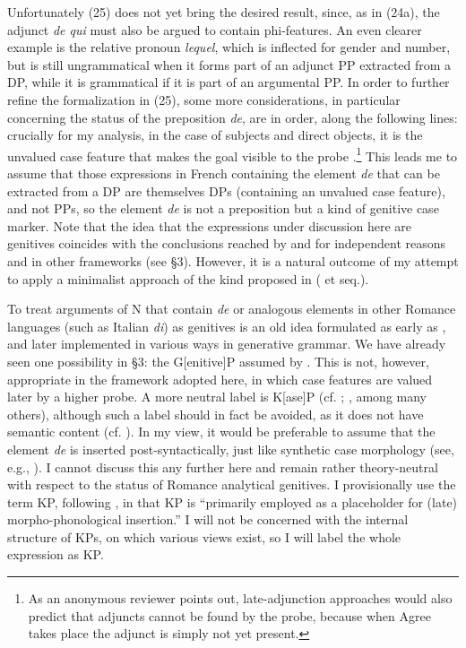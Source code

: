 \documentclass[output=paper]{langsci/langscibook}
\begin{document}
Unfortunately (25) does not yet bring the desired result, since, as in (24a), the adjunct \textit{de qui} must also be argued to contain phi-features. An even clearer example is the relative pronoun \textit{lequel}, which is inflected for gender and number, but is still ungrammatical when it forms part of an adjunct PP extracted from a DP, while it is grammatical if it is part of an argumental PP. In order to further refine the formalization in (25), some more considerations, in particular concerning the status of the preposition \textit{de}, are in order, along the following lines: crucially for my analysis, in the case of subjects and direct objects, it is the unvalued case feature that makes the goal visible to the probe \citep[123]{Chomsky2000}.\footnote{As an anonymous reviewer points out, late-adjunction approaches would also predict that adjuncts cannot be found by the probe, because when Agree takes place the adjunct is simply not yet present.} This leads me to assume that those expressions in French containing the element \textit{de} that can be extracted from a DP are themselves DPs (containing an unvalued case feature), and not PPs, so the element \textit{de} is not a preposition but a kind of genitive case marker. Note that the idea that the expressions under discussion here are genitives coincides with the conclusions reached by \citet{Gutiérrez-Bravo2001} and \citet{Cinque2014} for independent reasons and in other frameworks (see §3). However, it is a natural outcome of my attempt to apply a minimalist approach of the kind proposed in \citeauthor{Chomsky2000} (\citeyear{Chomsky2000} et seq.).

To treat arguments of N that contain \textit{de} or analogous elements in other Romance languages (such as Italian \textit{di}) as genitives is an old idea formulated as early as \citet{Benveniste1966}, and later implemented in various ways in generative grammar. We have already seen one possibility in §3: the G[enitive]P assumed by \citet{Cinque2014}. This is not, however, appropriate in the framework adopted here, in which case features are valued later by a higher probe. A more neutral label is K[ase]P (cf. \citealt{Bittner1996}; \citealt{Neeleman1999}, among many others), although such a label should in fact be avoided, as it does not have semantic content (cf. \citealt{Chomsky1995}). In my view, it would be preferable to assume that the element \textit{de} is inserted post-syntactically, just like synthetic case morphology (see, e.g., \citealt{Marchis2018}). I cannot discuss this any further here and remain rather theory-neutral with respect to the status of Romance analytical genitives. I provisionally use the term KP, following \citet[23]{Biggs2014}, in that KP is “primarily employed as a placeholder for (late) morpho-phonological insertion.” I will not be concerned with the internal structure of KPs, on which various views exist, so I will label the whole expression as KP.
\end{document}
